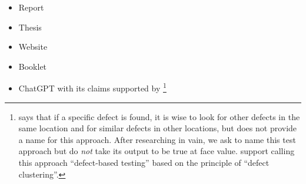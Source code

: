\begin{itemize}
    \item Report \citep{Kam2008,Gerrard2000a,Gerrard2000b}
    \item Thesis \citep{Bas2024}
    \item Website \citep{LambdaTest2024,Pandey2023}
    \item Booklet \citep{SPICE2022}
    \item \ifnotpaper \else ChatGPT \fi \citet{ChatGPT2024} with its claims
          supported by \citet{RusEtAl2008}\ifnotpaper%
              \footnote{\citet[p.~88]{Patton2006} says that if a specific
                  defect is found, it is wise to look for other defects in the
                  same location and for similar defects in other locations, but
                  does not provide a name for this approach. After researching
                  in vain, we ask \citet{ChatGPT2024} to name this test approach
                  but do \emph{not} take its output to be true at face value.
                  \citet{RusEtAl2008} support calling this approach ``defect-based
                  testing'' based on the principle of ``defect clustering''.
              }\fi
\end{itemize}
